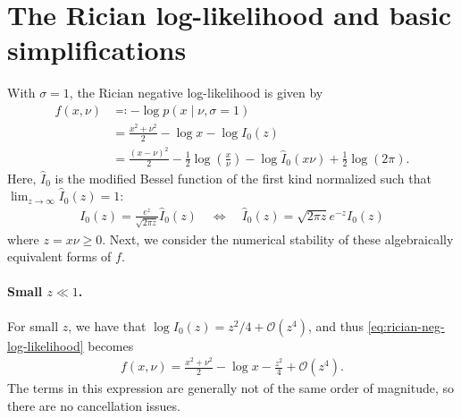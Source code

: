 \documentclass{article}
\begin{document}
\section{The Rician log-likelihood and basic simplifications}

With $\sigma=1$, the Rician negative log-likelihood is given by
%
\begin{align}
  f(x, \nu) & \eqqcolon -\log p(x \mid \nu, \sigma=1)                                                                                                                        \\
            & = \frac{x^2 + \nu^2}{2} - \log x - \log I_0(z) \label{eq:rician-neg-log-likelihood}                                                                            \\
            & = \frac{(x-\nu)^2}{2} - \frac{1}{2}\log\left(\frac{x}{\nu}\right) - \log \hat{I}_0(x \nu) + \frac{1}{2}\log(2\pi). \label{eq:rician-neg-log-likelihood-scaled}
\end{align}
%
Here, $\hat{I}_0$ is the modified Bessel function of the first kind normalized such that $\lim_{z\to\infty} \hat{I}_0(z) = 1$:
%
\begin{align}
  I_0(z) = \frac{e^z}{\sqrt{2\pi z}} \hat{I}_0(z) \quad \Leftrightarrow \quad \hat{I}_0(z) = \sqrt{2\pi z} e^{-z} I_0(z)
\end{align}
%
where $z = x\nu \ge 0$.
Next, we consider the numerical stability of these algebraically equivalent forms of $f$.

\paragraph{Small $z \ll 1$.}

For small $z$, we have that $\log I_0(z) = z^2/4 + \mathcal{O}(z^4)$, and thus \cref{eq:rician-neg-log-likelihood} becomes
%
\begin{align}
  f(x, \nu) = \frac{x^2 + \nu^2}{2} - \log x - \frac{z^2}{4} + \mathcal{O}(z^4).
\end{align}
%
The terms in this expression are generally not of the same order of magnitude, so there are no cancellation issues.
\end{document}
